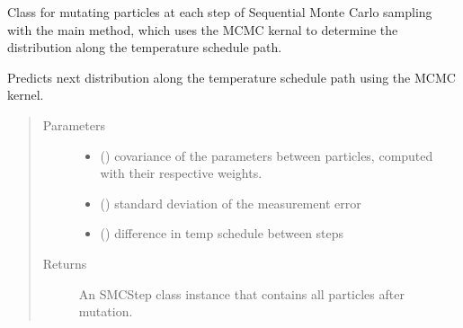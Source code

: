 \documentclass[letterpaper,10pt,english]{sphinxmanual}
\begin{document}
\begin{fulllineitems}
\label{\detokenize{source_code:smcpy.smc.particle_mutator.ParticleMutator}}
Class for mutating particles at each step of Sequential Monte Carlo sampling
with the main  method, which uses the MCMC kernal to
determine the distribution along the temperature schedule path.

\begin{fulllineitems}
\label{\detokenize{source_code:smcpy.smc.particle_mutator.ParticleMutator.mutate_new_particles}}
Predicts next distribution along the temperature schedule path using
the MCMC kernel.
\begin{quote}\begin{description}
\item[{Parameters}] \leavevmode\begin{itemize}
\item {} 
 () \textendash{} covariance of the parameters between particles,
computed with their respective weights.

\item {} 
 () \textendash{} standard deviation of the measurement error

\item {} 
 () \textendash{} difference in temp schedule between steps

\end{itemize}

\item[{Returns}] \leavevmode
An SMCStep class instance that contains all particles after
mutation.

\end{description}\end{quote}

\end{fulllineitems}


\end{fulllineitems}
\end{document}
